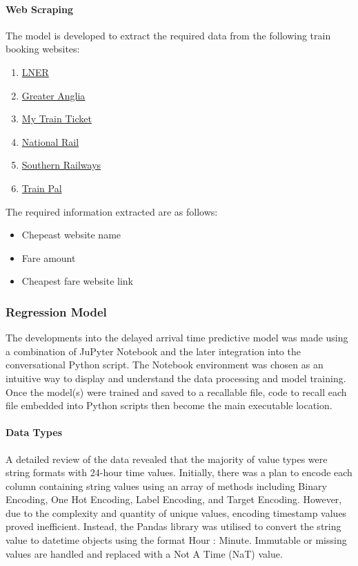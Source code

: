\paragraph{Web Scraping}
The model is developed to extract the required data from the following train booking websites:
\begin{enumerate}
    \item \href{https://www.lner.co.uk/}{LNER}
    \item \href{https://www.greateranglia.co.uk/}{Greater Anglia}
    \item \href{https://www.mytrainticket.co.uk/}{My Train Ticket}
    \item \href{https://www.nationalrail.co.uk/}{National Rail}
    \item \href{https://www.southernrailway.com/}{Southern Railways}
    \item \href{https://www.mytrainpal.com/}{Train Pal}
\end{enumerate}

The required information extracted are as follows:

\begin{itemize}
    \item Chepeast website name
    \item Fare amount
    \item Cheapest fare website link
\end{itemize} 

\subsubsection{Regression Model}
The developments into the delayed arrival time predictive model was made using a combination of JuPyter Notebook and the later integration into the conversational Python script. The Notebook environment was chosen as an intuitive way to display and understand the data processing and model training. Once the model(s) were trained and saved to a recallable file, code to recall each file embedded into Python scripts then become the main executable location.

\paragraph{Data Types}\label{sec: Data Processing}
A detailed review of the data revealed that the majority of value types were string formats with 24-hour time values. Initially, there was a plan to encode each column containing string values using an array of methods including Binary Encoding, One Hot Encoding, Label Encoding, and Target Encoding. However, due to the complexity and quantity of unique values, encoding timestamp values proved inefficient. Instead, the Pandas library was utilised to convert the string value to datetime objects using the format Hour : Minute. Immutable or missing values are handled and replaced with a Not A Time (NaT) value.\vspace{0.5cm}

